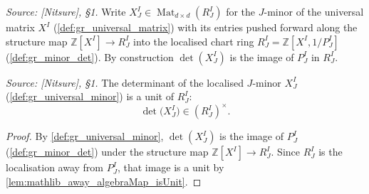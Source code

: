 \begin{definition}

  \label{def:gr_universal_minor}
  \textit{Source: [Nitsure], \S 1.}
  Write \(X^I_J \in \operatorname{Mat}_{d \times d}(R^I_J)\) for the \(J\)-minor of
  the universal matrix \(X^I\) (\cref{def:gr_universal_matrix}) with its entries
  pushed forward along the structure map \(\mathbb{Z}[X^I] \to R^I_J\) into the
  localised chart ring \(R^I_J = \mathbb{Z}[X^I, 1/P^I_J]\)
  (\cref{def:gr_minor_det}). By construction \(\det(X^I_J)\) is the image of
  \(P^I_J\) in \(R^I_J\).
\end{definition}

\begin{lemma}

  \label{lem:gr_minorDet_unit}
  \textit{Source: [Nitsure], \S 1.}
  The determinant of the localised \(J\)-minor \(X^I_J\)
  (\cref{def:gr_universal_minor}) is a unit of \(R^I_J\):
  \[
    \det\bigl(X^I_J\bigr) \in (R^I_J)^{\times}.
  \]
\end{lemma}
\begin{proof}
  \leanok
  By \cref{def:gr_universal_minor}, \(\det(X^I_J)\) is the image of \(P^I_J\)
  (\cref{def:gr_minor_det}) under the structure map
  \(\mathbb{Z}[X^I] \to R^I_J\). Since \(R^I_J\) is the localisation away from
  \(P^I_J\), that image is a unit by
  \cref{lem:mathlib_away_algebraMap_isUnit}.
\end{proof}

